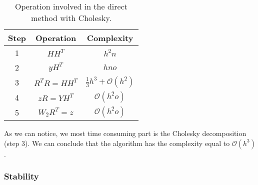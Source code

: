 \begingroup
    \renewcommand{\arraystretch}{2} %
    \begin{table}[!h]
        \begin{center}
            \begin{tabular}{ |c|c|c| } 
                \hline
                \textbf{Step} & \textbf{Operation} & \textbf{Complexity} \\ 
                \hline\hline
                1 & $HH^T$ & $h^2n$ \\ 
                \hline
                2 & $yH^T$ & $hno$ \\ 
                \hline
                3 & $R^TR = HH^T$ & $\frac{1}{3}h^3 + \mathcal{O}(h^2)$ \\ 
                \hline
                4 &$zR = YH^T$ & $\mathcal{O}(h^2o)$ \\ 
                \hline
                5 & $W_2R^T = z$ & $\mathcal{O}(h^2o)$ \\ 
                \hline
            \end{tabular}
            \caption{Operation involved in the direct method with Cholesky.}
            \label{table:complexity}
        \end{center}
    \end{table}
\endgroup
As we can notice, we most time consuming part is the Cholesky decomposition (step 3). We can conclude that the algorithm has the complexity equal to $\mathcal{O}(h^3)$.

\subsubsection{Stability}